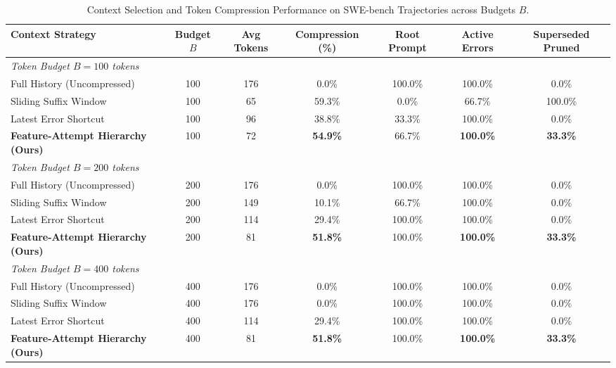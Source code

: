 \begin{table}[t]
\centering
\small
\caption{Context Selection and Token Compression Performance on SWE-bench Trajectories across Budgets $B$.}
\label{tab:swebench_results}
\begin{tabular}{lcccccc}
\toprule
\textbf{Context Strategy} & \textbf{Budget $B$} & \textbf{Avg Tokens} & \textbf{Compression (\%)} & \textbf{Root Prompt} & \textbf{Active Errors} & \textbf{Superseded Pruned} \\
\midrule
\multicolumn{7}{l}{\textit{Token Budget $B = 100$ tokens}} \\
  Full History (Uncompressed) & 100 & 176 & 0.0\% & 100.0\% & 100.0\% & 0.0\% \\
  Sliding Suffix Window & 100 & 65 & 59.3\% & 0.0\% & 66.7\% & 100.0\% \\
  Latest Error Shortcut & 100 & 96 & 38.8\% & 33.3\% & 100.0\% & 0.0\% \\
  \textbf{Feature-Attempt Hierarchy (Ours)} & 100 & 72 & \textbf{54.9\%} & 66.7\% & \textbf{100.0\%} & \textbf{33.3\%} \\
\midrule
\multicolumn{7}{l}{\textit{Token Budget $B = 200$ tokens}} \\
  Full History (Uncompressed) & 200 & 176 & 0.0\% & 100.0\% & 100.0\% & 0.0\% \\
  Sliding Suffix Window & 200 & 149 & 10.1\% & 66.7\% & 100.0\% & 0.0\% \\
  Latest Error Shortcut & 200 & 114 & 29.4\% & 100.0\% & 100.0\% & 0.0\% \\
  \textbf{Feature-Attempt Hierarchy (Ours)} & 200 & 81 & \textbf{51.8\%} & 100.0\% & \textbf{100.0\%} & \textbf{33.3\%} \\
\midrule
\multicolumn{7}{l}{\textit{Token Budget $B = 400$ tokens}} \\
  Full History (Uncompressed) & 400 & 176 & 0.0\% & 100.0\% & 100.0\% & 0.0\% \\
  Sliding Suffix Window & 400 & 176 & 0.0\% & 100.0\% & 100.0\% & 0.0\% \\
  Latest Error Shortcut & 400 & 114 & 29.4\% & 100.0\% & 100.0\% & 0.0\% \\
  \textbf{Feature-Attempt Hierarchy (Ours)} & 400 & 81 & \textbf{51.8\%} & 100.0\% & \textbf{100.0\%} & \textbf{33.3\%} \\
\bottomrule
\end{tabular}
\end{table}